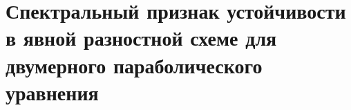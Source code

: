 \documentclass[__main__.tex]{subfiles}
\begin{document}
\section{Спектральный признак устойчивости в явной разностной схеме для двумерного параболического уравнения}
\end{document}
